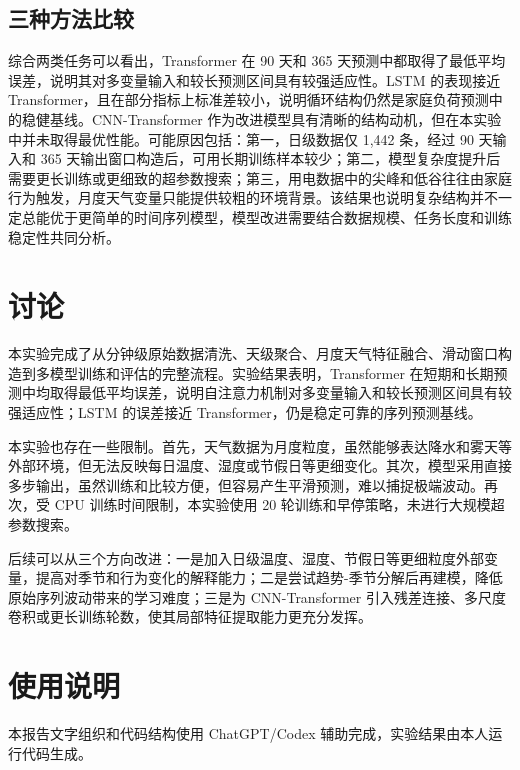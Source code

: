 \documentclass[12pt,a4paper]{ctexart}
\begin{document}
\subsection{三种方法比较}

综合两类任务可以看出，Transformer 在 90 天和 365 天预测中都取得了最低平均误差，说明其对多变量输入和较长预测区间具有较强适应性。LSTM 的表现接近 Transformer，且在部分指标上标准差较小，说明循环结构仍然是家庭负荷预测中的稳健基线。CNN-Transformer 作为改进模型具有清晰的结构动机，但在本实验中并未取得最优性能。可能原因包括：第一，日级数据仅 1,442 条，经过 90 天输入和 365 天输出窗口构造后，可用长期训练样本较少；第二，模型复杂度提升后需要更长训练或更细致的超参数搜索；第三，用电数据中的尖峰和低谷往往由家庭行为触发，月度天气变量只能提供较粗的环境背景。该结果也说明复杂结构并不一定总能优于更简单的时间序列模型，模型改进需要结合数据规模、任务长度和训练稳定性共同分析\cite{linear}。

\section{讨论}

本实验完成了从分钟级原始数据清洗、天级聚合、月度天气特征融合、滑动窗口构造到多模型训练和评估的完整流程。实验结果表明，Transformer 在短期和长期预测中均取得最低平均误差，说明自注意力机制对多变量输入和较长预测区间具有较强适应性；LSTM 的误差接近 Transformer，仍是稳定可靠的序列预测基线。

本实验也存在一些限制。首先，天气数据为月度粒度，虽然能够表达降水和雾天等外部环境，但无法反映每日温度、湿度或节假日等更细变化。其次，模型采用直接多步输出，虽然训练和比较方便，但容易产生平滑预测，难以捕捉极端波动。再次，受 CPU 训练时间限制，本实验使用 20 轮训练和早停策略，未进行大规模超参数搜索。

后续可以从三个方向改进：一是加入日级温度、湿度、节假日等更细粒度外部变量，提高对季节和行为变化的解释能力；二是尝试趋势-季节分解后再建模，降低原始序列波动带来的学习难度；三是为 CNN-Transformer 引入残差连接、多尺度卷积或更长训练轮数，使其局部特征提取能力更充分发挥。

\section*{使用说明}

本报告文字组织和代码结构使用 ChatGPT/Codex 辅助完成，实验结果由本人运行代码生成。
\end{document}
